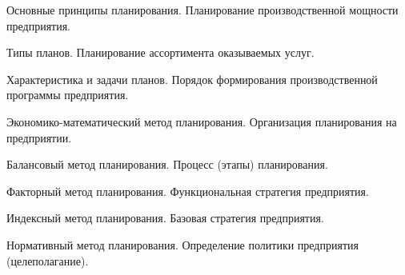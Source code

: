 \documentclass[
	14pt,
	a4paper,
	]
	{scrartcl}
\begin{document}
\newpage


\shapk
{}
\setcounter{zad}{0}

\vfill
\z Основные принципы планирования.
 \vfill
\z Планирование производственной мощности предприятия.
 \vfill

\vfill

\newpage


\shapk
{}
\setcounter{zad}{0}

\vfill
\z Типы планов.
 \vfill
\z Планирование ассортимента оказываемых услуг.
 \vfill

\vfill

\newpage


\shapk
{}
\setcounter{zad}{0}

\vfill
\z Характеристика и задачи планов.
 \vfill
\z Порядок формирования производственной программы предприятия.
 \vfill

\vfill

\newpage


\shapk
{}
\setcounter{zad}{0}

\vfill
\z Экономико-математический метод планирования.
 \vfill
\z Организация планирования на предприятии.
 \vfill

\vfill

\newpage


\shapk
{}
\setcounter{zad}{0}

\vfill
\z Балансовый метод планирования.
 \vfill
\z Процесс (этапы) планирования.
 \vfill

\vfill

\newpage


\shapk
{}
\setcounter{zad}{0}

\vfill
\z Факторный метод планирования.
 \vfill
\z Функциональная стратегия предприятия.
 \vfill

\vfill

\newpage


\shapk
{}
\setcounter{zad}{0}

\vfill
\z Индексный метод планирования.
 \vfill
\z Базовая стратегия предприятия.
 \vfill

\vfill

\newpage


\shapk
{}
\setcounter{zad}{0}

\vfill
\z Нормативный метод планирования.
 \vfill
\z Определение политики предприятия (целеполагание).
 \vfill
\end{document}
